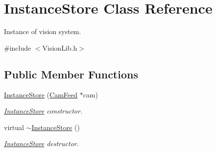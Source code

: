 \hypertarget{classInstanceStore}{}\section{Instance\+Store Class Reference}
\label{classInstanceStore}


Instance of vision system.  




{\ttfamily \#include $<$Vision\+Lib.\+h$>$}

\subsection*{Public Member Functions}
\begin{DoxyCompactItemize}
\item 
\hyperlink{classInstanceStore_a7a4c15b300c608a4b5b12549bad574fe}{Instance\+Store} (\hyperlink{classCamFeed}{Cam\+Feed} $\ast$cam)
\begin{DoxyCompactList}\small\item\em \hyperlink{classInstanceStore}{Instance\+Store} constructor. \end{DoxyCompactList}\item 
\hypertarget{classInstanceStore_a944cd345f7921beb8a449c06f8d95f5a}{}virtual \hyperlink{classInstanceStore_a944cd345f7921beb8a449c06f8d95f5a}{$\sim$\+Instance\+Store} ()\label{classInstanceStore_a944cd345f7921beb8a449c06f8d95f5a}

\begin{DoxyCompactList}\small\item\em \hyperlink{classInstanceStore}{Instance\+Store} destructor. \end{DoxyCompactList}\end{DoxyCompactItemize}
